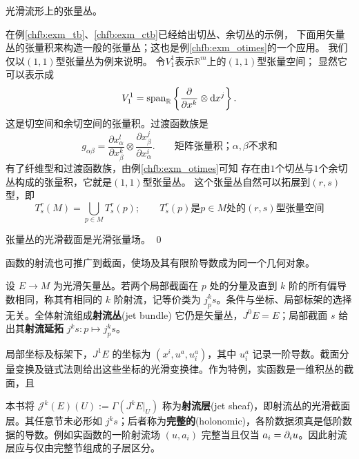 \begin{example}
    光滑流形上的张量丛。
\end{example}
在例\ref{chfb:exm_tb}、\ref{chfb:exm_ctb}已经给出切丛、余切丛的示例，
下面用矢量丛的张量积来构造一般的张量丛；这也是例\ref{chfb:exm_otimes}的一个应用。
我们仅以$(1,1)$型张量丛为例来说明。
令$V^1_1$表示$\mathbb{R}^m$上的$(1,1)$型张量空间；
显然它可以表示成
\begin{equation*}
    V^1_1 = \operatorname{span}_{\mathbb{R}}\left\{  \frac{\partial}{\partial x^k}\otimes \dd x^j \right\} .
\end{equation*}
这是切空间和余切空间的张量积。过渡函数族是
\begin{equation*}
    g_{\alpha\beta} = \frac{\partial {x}^l_\alpha}{\partial {x}^k_\beta} \otimes
    \frac{\partial {x}^j_\beta}{\partial {x}^i_\alpha}  .
    \qquad \text{矩阵张量积；}\alpha,\beta \text{不求和}
\end{equation*}
有了纤维型和过渡函数族，由例\ref{chfb:exm_otimes}可知
存在由$1$个切丛与$1$个余切丛构成的张量积，它就是$(1,1)$型张量丛。
这个张量丛自然可以拓展到$(r,s)$型，即
\begin{equation*}
    T_s^r(M)=\bigcup_{p \in M} T_s^r(p); \qquad
    T_s^r(p)\text{是}p\in M\text{处的}(r,s)\text{型张量空间}
\end{equation*}

张量丛的光滑截面是光滑张量场。
\qed

函数的射流也可推广到截面，使场及其有限阶导数成为同一个几何对象。

\begin{definition}\label{def:jet-bundle}
    设 $E\to M$ 为光滑矢量丛。若两个局部截面在 $p$ 处的分量及直到 $k$ 阶的所有偏导数相同，称其有相同的 $k$ 阶射流，记等价类为 $j_p^ks$。条件与坐标、局部标架的选择无关。全体射流组成\textbf{射流丛}(jet bundle)
    它仍是矢量丛，$J^0E=E$；局部截面 $s$ 给出其\textbf{射流延拓} $j^ks:p\mapsto j_p^ks$。
\end{definition}

局部坐标及标架下，$J^1E$ 的坐标为 $(x^i,u^a,u^a_i)$，其中 $u^a_i$ 记录一阶导数。截面分量变换及链式法则给出这些坐标的光滑变换律。作为特例，实函数是一维积丛的截面，且

\begin{remark}
    本书将 $\mathcal J^k(E)(U):=\Gamma(J^kE|_U)$ 称为\textbf{射流层}(jet sheaf)，即射流丛的光滑截面层。其任意节未必形如 $j^ks$；后者称为\textbf{完整的}(holonomic)，各阶数据须真是低阶数据的导数。例如实函数的一阶射流场 $(u,a_i)$ 完整当且仅当 $a_i=\partial_i u$。因此射流层应与仅由完整节组成的子层区分。
\end{remark}

